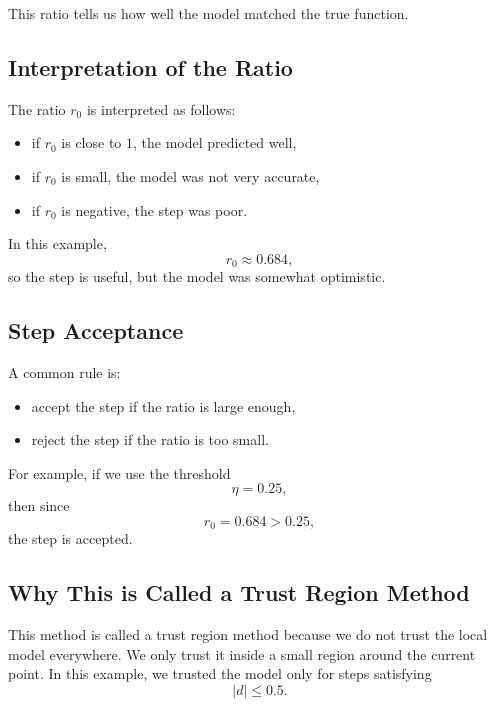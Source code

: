 \documentclass{article}
\begin{document}
This ratio tells us how well the model matched the true function.

\subsection{Interpretation of the Ratio}

The ratio $r_0$ is interpreted as follows:
\begin{itemize}
    \item if $r_0$ is close to $1$, the model predicted well,
    \item if $r_0$ is small, the model was not very accurate,
    \item if $r_0$ is negative, the step was poor.
\end{itemize}

In this example,
\begin{equation}
r_0 \approx 0.684,
\end{equation}
so the step is useful, but the model was somewhat optimistic.

\subsection{Step Acceptance}

A common rule is:
\begin{itemize}
    \item accept the step if the ratio is large enough,
    \item reject the step if the ratio is too small.
\end{itemize}

For example, if we use the threshold
\begin{equation}
\eta = 0.25,
\end{equation}
then since
\begin{equation}
r_0 = 0.684 > 0.25,
\end{equation}
the step is accepted.

\subsection{Why This is Called a Trust Region Method}

This method is called a trust region method because we do not trust the local model everywhere. We only trust it inside a small region around the current point. In this example, we trusted the model only for steps satisfying
\begin{equation}
|d| \leq 0.5.
\end{equation}
\end{document}
